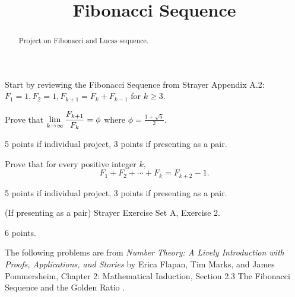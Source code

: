 \documentclass[letterpaper, 11 pt]{ximera}
\title{Fibonacci Sequence}
\begin{document}
\begin{abstract}
 Project on Fibonacci and Lucas sequence.
\end{abstract}
\maketitle

\begin{exploration}
 Start by reviewing the Fibonacci Sequence from Strayer Appendix A.2: 
 $F_1=1, F_2=1, F_{k+1}=F_k+F_{k-1}$ for $k\geq3.$ 
\begin{problem}
	Prove that $\displaystyle\lim_{k\to\infty}\frac{F_{k+1}}{F_k}=\phi$ where $\phi=\frac{1+\sqrt{5}}{2}.$
	
\begin{rubric} 5 points if individual project, 3 points if presenting as a pair.
\end{rubric}
\end{problem}

\begin{problem}
 	Prove that for every positive integer $k,$ 
	\[F_1+F_2+\cdots+F_k=F_{k+2}-1.\]
	
\begin{rubric} 5 points if individual project, 3 points if presenting as a pair.
\end{rubric}
\end{problem}

\begin{problem}(If presenting as a pair)
 	Strayer Exercise Set A, Exercise 2.
	\begin{rubric} 6 points.
\end{rubric}
\end{problem}

	
\end{exploration}

The following problems are from \emph{Number Theory: A Lively Introduction with Proofs, Applications, and Stories} by Erica Flapan, Tim Marks, and James Pommersheim, Chapter 2: Mathematical Induction, Section 2.3 The Fibonacci Sequence and the Golden Ratio \cite{theo}.
\end{document}
